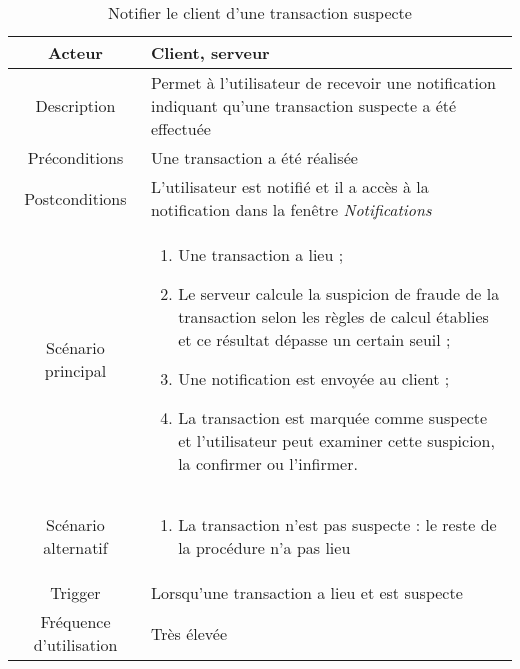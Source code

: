 \documentclass{article}
\begin{document}
\begin{table}

\begin{tabular}{|c|p{11cm}|}
\hline
Acteur & Client, serveur \\
\hline
Description & Permet à l'utilisateur de recevoir une notification indiquant qu'une transaction suspecte a été effectuée \\
\hline
Préconditions & Une transaction a été réalisée \\
\hline
Postconditions & L'utilisateur est notifié et il a accès à la notification dans la fenêtre \emph{Notifications} \\
\hline
Scénario principal & \begin{enumerate}
\item Une transaction a lieu ;
\item Le serveur calcule la suspicion de fraude de la transaction selon les règles de calcul établies et ce résultat dépasse un certain seuil ;
\item Une notification est envoyée au client ;
\item La transaction est marquée comme suspecte et l'utilisateur peut examiner cette suspicion, la confirmer ou l'infirmer.
\end{enumerate} \\
\hline
Scénario alternatif & \begin{enumerate}
\item La transaction n'est pas suspecte : le reste de la procédure n'a pas lieu
\end{enumerate} \\
\hline
Trigger & Lorsqu'une transaction a lieu et est suspecte \\
\hline
Fréquence d'utilisation & Très élevée \\
\hline
\end{tabular}

\caption{Notifier le client d'une transaction suspecte}

\end{table}
\end{document}
